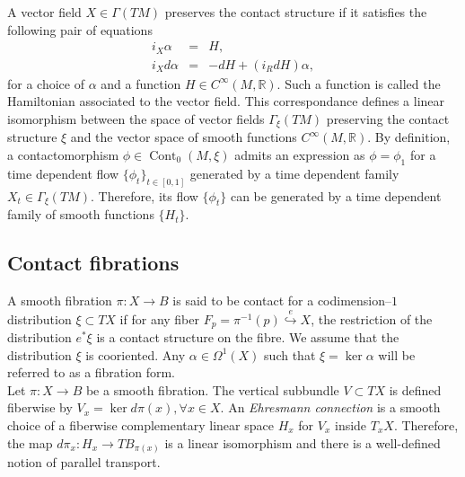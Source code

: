 \documentclass[10pt]{amsart}
\begin{document}
\noindent A vector field $X\in\Gamma(TM)$ preserves the contact structure if it satisfies the following pair of equations
\begin{eqnarray*}
i_X \alpha & = & H, \\
i_X d\alpha &= & -dH + (i_R dH)\alpha,
\end{eqnarray*}
for a choice of $\alpha$ and a function $H\in C^{\infty}(M,{\mathbb{R}})$. Such a function is called the Hamiltonian associated to the vector field. This correspondance defines a linear isomorphism between the space of vector fields $\Gamma_{\xi}(TM)$ preserving the contact structure $\xi$ and the vector space of smooth functions $C^{\infty}(M, {\mathbb{R}})$. By definition, a contactomorphism $\phi \in {\operatorname{Cont}}_0(M, \xi)$ admits an expression as $\phi=\phi_1$ for a time dependent flow $\{ \phi_t \}_{t\in[0,1]}$ generated by a time dependent family $X_t\in \Gamma_{\xi}(TM)$. Therefore, its flow $\{{\phi}_t\}$ can be generated by a time dependent family of smooth functions $\{H_t \}$.\\

\subsection{Contact fibrations}
\noindent A smooth fibration $\pi: X \longrightarrow B$ is said to be contact for a codimension--$1$ distribution $\xi \subset TX$ if for any fiber $F_p= \pi^{-1}(p)\stackrel{e}{\hookrightarrow}X$, the restriction of the distribution $e^* \xi$ is a contact structure on the fibre. We assume that the distribution $\xi$ is cooriented. Any $\alpha\in\Omega^1(X)$ such that $\xi=\ker\alpha$ will be referred to as a fibration form.\\

\noindent Let $\pi:X \longrightarrow B$ be a smooth fibration. The vertical subbundle $V\subset TX$ is defined fiberwise by $V_x= \ker d\pi(x), \forall x\in X$. An {\em Ehresmann connection} is a smooth choice of a fiberwise complementary linear space $H_x$ for $V_x$ inside $T_xX$. Therefore, the map $d\pi_x: H_x \longrightarrow TB_{\pi(x)}$ is a linear isomorphism and there is a well-defined notion of parallel transport. \\
\end{document}
